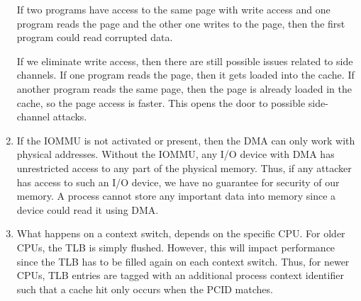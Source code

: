 \documentclass[sheet=1, english]{dexercise}
\begin{document}
\begin{enumerate}
    If two programs have access to the same page with write access and one
    program reads the page and the other one writes to the page, then the first
    program could read corrupted data.

    If we eliminate write access, then there are still possible issues related
    to side channels. If one program reads the page, then it gets loaded into
    the cache. If another program reads the same page, then the page is already
    loaded in the cache, so the page access is faster. This opens the door to
    possible side-channel attacks.
  \item
    If the IOMMU is not activated or present, then the DMA can only work with
    physical addresses. Without the IOMMU, any I/O device with DMA has
    unrestricted access to any part of the physical memory. Thus, if any
    attacker has access to such an I/O device, we have no guarantee for security
    of our memory. A process cannot store any important data into memory since a
    device could read it using DMA.
  \item
    What happens on a context switch, depends on the specific CPU. For older
    CPUs, the TLB is simply flushed. However, this will impact performance since
    the TLB has to be filled again on each context switch. Thus, for newer CPUs,
    TLB entries are tagged with an additional process context identifier such
    that a cache hit only occurs when the PCID matches.
\end{enumerate}

\end{document}
